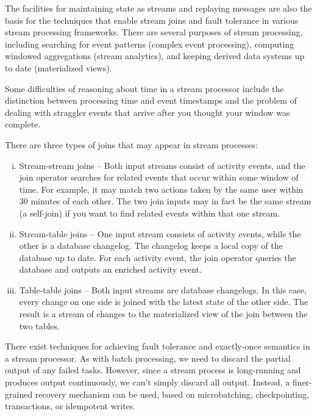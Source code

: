 \documentclass{article}
\begin{document}
    The facilities for maintaining state as streams and replaying messages are also the basis for the techniques that enable stream joins and fault tolerance in various stream processing frameworks. There are several purposes of stream processing, including searching for event patterns (complex event processing), computing windowed aggregations (stream analytics), and keeping derived data systems up to date (materialized views).
    
    Some difficulties of reasoning about time in a stream processor include the distinction between processing time and event timestamps and the problem of dealing with straggler events that arrive after you thought your window was complete.

    There are three types of joins that may appear in stream processes:
    \begin{enumerate}[i.]
        \item Stream-stream joins -- Both input streams consist of activity events, and the join operator searches for related events that occur within some window of time. For example, it may match two actions taken by the same user within 30 minutes of each other. The two join inputs may in fact be the same stream (a self-join) if you want to find related events within that one stream.
        
        \item Stream-table joins -- One input stream consists of activity events, while the other is a database changelog. The changelog keeps a local copy of the database up to date. For each activity event, the join operator queries the database and outputs an enriched activity event.
        
        \item Table-table joins -- Both input streams are database changelogs. In this case, every change on one side is joined with the latest state of the other side. The result is a stream of changes to the materialized view of the join between the two tables.
    \end{enumerate}
    
    There exist techniques for achieving fault tolerance and exactly-once semantics in a stream processor. As with batch processing, we need to discard the partial output of any failed tasks. However, since a stream process is long-running and produces output continuously, we can’t simply discard all output. Instead, a finer-grained recovery mechanism can be used, based on microbatching, checkpointing, transactions, or idempotent writes.
\end{document}
